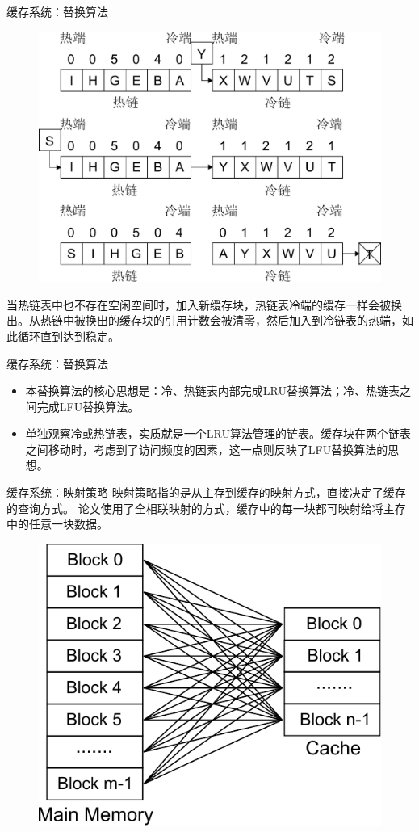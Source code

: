 \documentclass[compress]{beamer}
\begin{document}
\begin{frame}{缓存系统：替换算法}
\begin{figure}
\includegraphics[width=0.6\linewidth]{../graph/replace-algo-4}
\end{figure}
当热链表中也不存在空闲空间时，加入新缓存块，热链表冷端的缓存一样会被换出。从热链中被换出的缓存块的引用计数会被清零，然后加入到冷链表的热端，如此循环直到达到稳定。
\end{frame}

\begin{frame}{缓存系统：替换算法}
\begin{itemize}
\item 本替换算法的核心思想是：冷、热链表内部完成LRU替换算法；冷、热链表之间完成LFU替换算法。
\item 单独观察冷或热链表，实质就是一个LRU算法管理的链表。缓存块在两个链表之间移动时，考虑到了访问频度的因素，这一点则反映了LFU替换算法的思想。
\end{itemize}
\end{frame}

\begin{frame}{缓存系统：映射策略}
映射策略指的是从主存到缓存的映射方式，直接决定了缓存的查询方式。
论文使用了全相联映射的方式，缓存中的每一块都可映射给将主存中的任意一块数据。
\begin{figure}
\includegraphics[width=0.6\linewidth]{../graph/cache-map-2}
\end{figure}
\end{frame}
\end{document}
